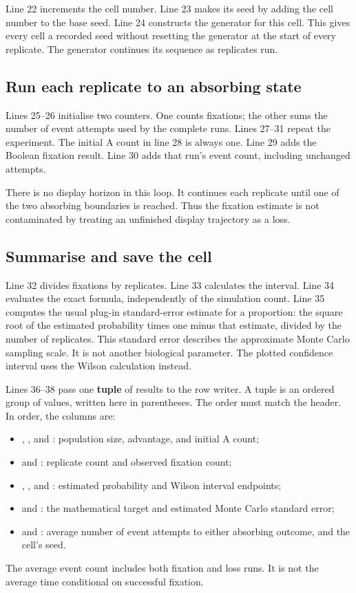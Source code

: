 Line 22 increments the cell number. Line 23 makes its seed by adding the
cell number to the base seed. Line 24 constructs the generator for this
cell. This gives every cell a recorded seed without resetting the generator
at the start of every replicate. The generator continues its sequence as
replicates run.

\subsection{Run each replicate to an absorbing state}

Lines 25--26 initialise two counters. One counts fixations; the other sums
the number of event attempts used by the complete runs. Lines 27--31 repeat
the experiment. The initial A count in line 28 is always one.
Line 29 adds the Boolean fixation result. Line 30 adds that run's event
count, including unchanged attempts.

There is no display horizon in this loop. It continues each replicate until
one of the two absorbing boundaries is reached. Thus the fixation estimate
is not contaminated by treating an unfinished display trajectory as a loss.

\subsection{Summarise and save the cell}

Line 32 divides fixations by replicates. Line 33 calculates the interval.
Line 34 evaluates the exact formula, independently of the simulation count.
Line 35 computes the usual plug-in standard-error estimate for a proportion:
the square root of the estimated probability times one minus that estimate,
divided by the number of replicates. This standard error describes the
approximate Monte Carlo sampling scale. It is not another biological parameter.
The plotted confidence interval uses the Wilson calculation instead.

Lines 36--38 pass one \textbf{tuple} of results to the row writer. A tuple
is an ordered group of values, written here in parentheses. The order must
match the header. In order, the columns are:
\begin{itemize}
 \item {}, , and : population size, advantage,
       and initial A count;
 \item {} and : replicate count and
       observed fixation count;
 \item {}, , and : estimated
       probability and Wilson interval endpoints;
 \item {} and : the mathematical target
       and estimated Monte Carlo standard error;
 \item {} and : average number of event
       attempts to either absorbing outcome, and the cell's seed.
\end{itemize}
The average event count includes both fixation and loss runs. It is not
the average time conditional on successful fixation.

